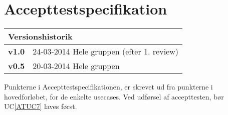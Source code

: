 \chapter{Accepttestspecifikation}

\begin{table}[!htbp] \centering
\begin{tabular}{|p{2cm}|p{8cm}|}
	\hline
		\multicolumn{2}{|l|}{Versionshistorik} \\ \hline
		\textbf{v1.0} &24-03-2014 Hele gruppen (efter 1. review) \\ \hline
		\textbf{v0.5} &20-03-2014 Hele gruppen \\ \hline
	\end{tabular}
\end{table}

Punkterne i Accepttestspecifikationen, er skrevet ud fra punkterne i hovedforløbet, for de enkelte usecases.
Ved udførsel af accepttesten, bør UC\ref{ATUC7} laves først.


















